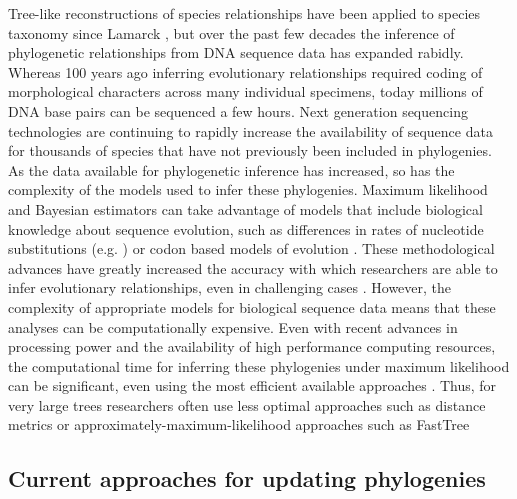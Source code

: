 \documentclass[10pt]{article}
\begin{document}
Tree-like reconstructions of species relationships have been applied to species taxonomy since Lamarck \cite{Lamarck_philosophie_1809}, but over the past few decades the inference of phylogenetic relationships from DNA sequence data has expanded rabidly. 
Whereas 100 years ago inferring evolutionary relationships required coding of morphological characters across many individual specimens, today millions of DNA base pairs can be sequenced a few hours. 
Next generation sequencing technologies are continuing to rapidly increase the availability of sequence data for thousands of species that have not previously been included in phylogenies. 
As the data available for phylogenetic inference has increased, so has the complexity of the models used to infer these phylogenies. 
Maximum likelihood and Bayesian estimators can take advantage of models that include biological knowledge about sequence evolution, such as differences in rates of nucleotide substitutions (e.g. \cite{Jukes_evolution_1969}) or codon based models of evolution \cite{shapiro_choosing_2006}. 
These methodological advances have greatly increased the accuracy with which researchers are able to infer evolutionary relationships, even in challenging cases \cite{kuhner_simulation_1994}. 
However, the complexity of appropriate models for biological sequence data means that these analyses can be computationally expensive. 
Even with recent advances in processing power and the availability of high performance computing resources, the computational time for inferring these phylogenies under maximum likelihood can be significant, even using the most efficient available approaches \cite{stamatakis_RAxML-VI-HPC:_2006}.
Thus, for very large trees researchers often use less optimal approaches such as distance metrics or approximately-maximum-likelihood approaches such as FastTree \cite{price_fasttree:_2009, price_fasttree_2010}


\subsection*{Current approaches for updating phylogenies}
\end{document}
